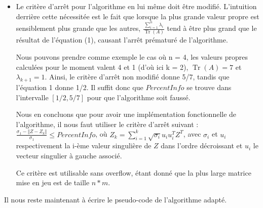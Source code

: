 \documentclass[a4paper,12pt]{article}
\DeclareMathOperator{\Tr}{Tr}
\newcommand{\norme}[1]{\left\Vert #1\right\Vert}
\begin{document}
\begin{itemize}
        \item Le critère d'arrêt pour l'algorithme en lui même doit être
            modifié. L'intuition derrière cette nécessitée est le fait que
            lorsque la plus grande valeur propre est sensiblement plus
            grande que les autres,
            $\displaystyle \frac{\sum\limits_{i=1}^n \lambda_i}{\Tr(A)}$
            tend à être plus grand que le résultat de l'équation (1), causant
            l'arrêt prématuré de l'algorithme.

            Nous pouvons prendre comme exemple le cas où n = 4, les valeurs
            propres calculées pour le moment valent 4 et 1 (d'où ici k = 2),
            $\Tr(A) = 7$ et $\lambda_{k+1} = 1$. Ainsi, le critère d'arrêt non
            modifié donne 5/7, tandis que l'équation 1 donne 1/2. Il suffit donc
            que $PercentInfo$ se trouve dans l'intervalle $[1/2,5/7]$ pour que
            l'algorithme soit faussé.

            Nous en concluons que pour avoir une implémentation fonctionnelle de
            l'algorithme, il nous faut utiliser le critère d'arrêt suivant :
            $\displaystyle \frac{\sigma_1 - \norme{Z - Z_k}}{\sigma_1} \leq
            PercentInfo$, où
            $Z_k = \sum\limits_{i=1}^k \sqrt{\sigma_i}u_iu_i^TZ^T$, avec
            $\sigma_i$ et $u_i$ respectivement la i-ème valeur singulière de $Z$
            dans l'ordre décroissant et $u_i$ le vecteur singulier à gauche
            associé.

            Ce critère est utilisable sans overflow, étant donné que
            la plus large matrice mise en jeu est de taille $n*m$.
        \end{itemize}
    \bigskip

        Il nous reste maintenant à écrire le pseudo-code de l'algorithme adapté.
\end{document}
